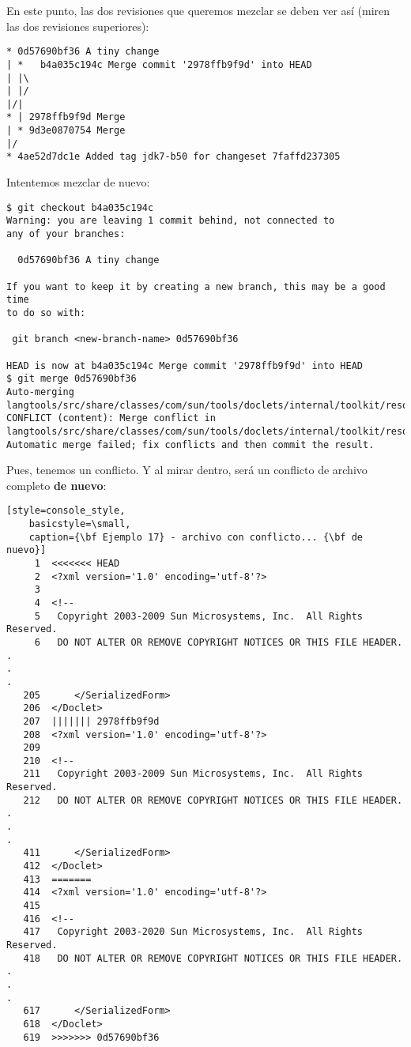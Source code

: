 En este punto, las dos revisiones que queremos mezclar se deben ver así (miren las dos revisiones superiores):
\begin{lstlisting}[style=console_style,
	basicstyle=\small,
	caption={\bf Ejemplo 17} - historia de las revisiones]
* 0d57690bf36 A tiny change
| *   b4a035c194c Merge commit '2978ffb9f9d' into HEAD
| |\  
| |/  
|/|   
* | 2978ffb9f9d Merge
| * 9d3e0870754 Merge
|/  
* 4ae52d7dc1e Added tag jdk7-b50 for changeset 7faffd237305
\end{lstlisting}

Intentemos mezclar de nuevo:

\begin{lstlisting}[style=console_style,
	basicstyle=\small,
	caption={\bf Ejemplo 17} - nueva mezcla]
$ git checkout b4a035c194c
Warning: you are leaving 1 commit behind, not connected to
any of your branches:

  0d57690bf36 A tiny change

If you want to keep it by creating a new branch, this may be a good time
to do so with:

 git branch <new-branch-name> 0d57690bf36

HEAD is now at b4a035c194c Merge commit '2978ffb9f9d' into HEAD
$ git merge 0d57690bf36
Auto-merging langtools/src/share/classes/com/sun/tools/doclets/internal/toolkit/resources/doclet.xml
CONFLICT (content): Merge conflict in langtools/src/share/classes/com/sun/tools/doclets/internal/toolkit/resources/doclet.xml
Automatic merge failed; fix conflicts and then commit the result.
\end{lstlisting}

Pues, tenemos un conflicto. Y al mirar dentro, será un conflicto de archivo completo {\bf de nuevo}:

\begin{lstlisting}[style=console_style,
	basicstyle=\small,
	caption={\bf Ejemplo 17} - archivo con conflicto... {\bf de nuevo}]
     1  <<<<<<< HEAD
     2  <?xml version='1.0' encoding='utf-8'?>
     3  
     4  <!--
     5   Copyright 2003-2009 Sun Microsystems, Inc.  All Rights Reserved.
     6   DO NOT ALTER OR REMOVE COPYRIGHT NOTICES OR THIS FILE HEADER.
.
.
.
   205      </SerializedForm>
   206  </Doclet>
   207  ||||||| 2978ffb9f9d
   208  <?xml version='1.0' encoding='utf-8'?>
   209  
   210  <!--
   211   Copyright 2003-2009 Sun Microsystems, Inc.  All Rights Reserved.
   212   DO NOT ALTER OR REMOVE COPYRIGHT NOTICES OR THIS FILE HEADER.
.
.
.
   411      </SerializedForm>
   412  </Doclet>
   413  =======
   414  <?xml version='1.0' encoding='utf-8'?>
   415  
   416  <!--
   417   Copyright 2003-2020 Sun Microsystems, Inc.  All Rights Reserved.
   418   DO NOT ALTER OR REMOVE COPYRIGHT NOTICES OR THIS FILE HEADER.
.
.
.
   617      </SerializedForm>
   618  </Doclet>
   619  >>>>>>> 0d57690bf36
\end{lstlisting}

